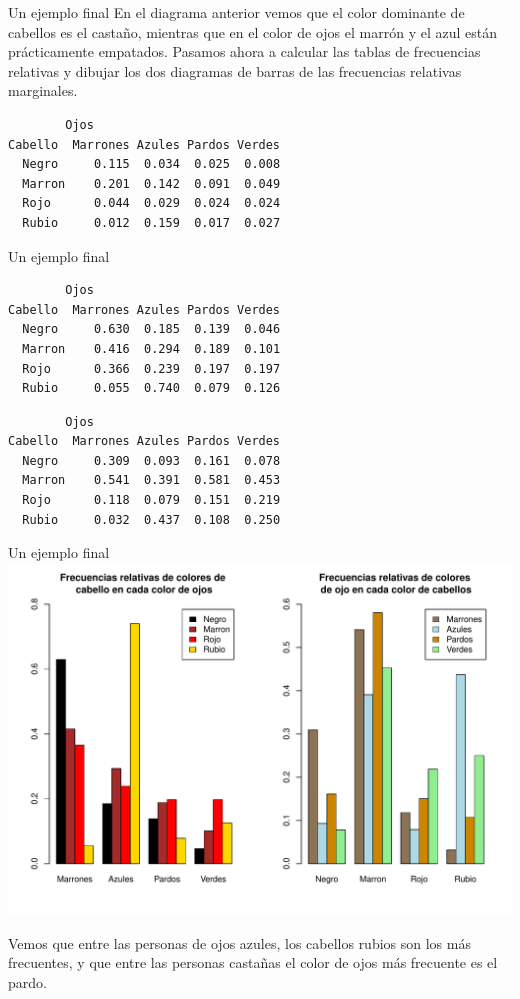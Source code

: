 \documentclass[
  ignorenonframetext,
]{beamer}
\begin{document}
\begin{frame}[fragile]{Un ejemplo final}
\label{un-ejemplo-final-6}
En el diagrama anterior vemos que el color dominante de cabellos es el
castaño, mientras que en el color de ojos el marrón y el azul están
prácticamente empatados. Pasamos ahora a calcular las tablas de
frecuencias relativas y dibujar los dos diagramas de barras de las
frecuencias relativas marginales.

\begin{verbatim}
        Ojos
Cabello  Marrones Azules Pardos Verdes
  Negro     0.115  0.034  0.025  0.008
  Marron    0.201  0.142  0.091  0.049
  Rojo      0.044  0.029  0.024  0.024
  Rubio     0.012  0.159  0.017  0.027
\end{verbatim}
\end{frame}

\begin{frame}[fragile]{Un ejemplo final}
\label{un-ejemplo-final-7}
\begin{verbatim}
        Ojos
Cabello  Marrones Azules Pardos Verdes
  Negro     0.630  0.185  0.139  0.046
  Marron    0.416  0.294  0.189  0.101
  Rojo      0.366  0.239  0.197  0.197
  Rubio     0.055  0.740  0.079  0.126
\end{verbatim}

\begin{verbatim}
        Ojos
Cabello  Marrones Azules Pardos Verdes
  Negro     0.309  0.093  0.161  0.078
  Marron    0.541  0.391  0.581  0.453
  Rojo      0.118  0.079  0.151  0.219
  Rubio     0.032  0.437  0.108  0.250
\end{verbatim}
\end{frame}

\begin{frame}{Un ejemplo final}
\label{un-ejemplo-final-8}
\includegraphics{R_base_files/figure-beamer/unnamed-chunk-107-1.pdf}

Vemos que entre las personas de ojos azules, los cabellos rubios son los
más frecuentes, y que entre las personas castañas el color de ojos más
frecuente es el pardo.
\end{frame}
\end{document}
